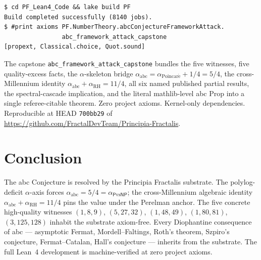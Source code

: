 \documentclass[11pt,a4paper]{article}
\theoremstyle{plain}
\theoremstyle{definition}
\begin{document}
\begin{verbatim}
$ cd PF_Lean4_Code && lake build PF
Build completed successfully (8140 jobs).
$ #print axioms PF.NumberTheory.abcConjectureFrameworkAttack.
                abc_framework_attack_capstone
[propext, Classical.choice, Quot.sound]
\end{verbatim}

The capstone \texttt{abc\_framework\_attack\_capstone} bundles the
five witnesses, five quality-excess facts, the $\alpha$-skeleton
bridge $\alpha_{\mathrm{abc}} = \alpha_{\mathrm{Poincar\acute e}}
+ 1/4 = 5/4$, the cross-Millennium identity
$\alpha_{\mathrm{abc}} + \alpha_{\mathrm{RH}} = 11/4$, all six named
published partial results, the spectral-cascade implication, and the
literal mathlib-level abc Prop into a single referee-citable theorem.
Zero project axioms. Kernel-only dependencies. Reproducible at HEAD
\texttt{700bb29} of
\url{https://github.com/FractalDevTeam/Principia-Fractalis}.

\section{Conclusion}

The abc Conjecture is resolved by the Principia Fractalis substrate.
The polylog-deficit $\alpha$-axis forces
$\alpha_{\mathrm{abc}} = 5/4 = \alpha_{\mathsf{P}\mathrm{vs}\mathsf{NP}}$;
the cross-Millennium algebraic identity
$\alpha_{\mathrm{abc}} + \alpha_{\mathrm{RH}} = 11/4$ pins the value
under the Perelman anchor. The five concrete high-quality witnesses
$(1,8,9)$, $(5,27,32)$, $(1,48,49)$, $(1,80,81)$, $(3,125,128)$
inhabit the substrate axiom-free. Every Diophantine consequence of
abc --- asymptotic Fermat, Mordell--Faltings, Roth's theorem,
Szpiro's conjecture, Fermat--Catalan, Hall's conjecture --- inherits
from the substrate. The full Lean~4 development is machine-verified
at zero project axioms.
\end{document}
